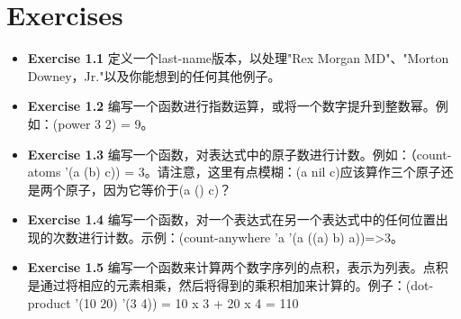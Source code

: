 \section{Exercises}
\begin{itemize}
	\item \textbf{Exercise 1.1 } 定义一个last-name版本，以处理"Rex Morgan MD"、"Morton Downey，Jr."以及你能想到的任何其他例子。
	\item \textbf{Exercise 1.2 } 编写一个函数进行指数运算，或将一个数字提升到整数幂。例如：(power 3 2) = 9。
	\item \textbf{Exercise 1.3 } 编写一个函数，对表达式中的原子数进行计数。例如：（count-atoms '(a (b) c)) = 3。请注意，这里有点模糊：(a nil c)应该算作三个原子还是两个原子，因为它等价于(a () c)？
	\item \textbf{Exercise 1.4 } 编写一个函数，对一个表达式在另一个表达式中的任何位置出现的次数进行计数。示例：(count-anywhere  'a '(a ((a) b) a))=>3。
	\item \textbf{Exercise 1.5 } 编写一个函数来计算两个数字序列的点积，表示为列表。点积是通过将相应的元素相乘，然后将得到的乘积相加来计算的。例子：(dot-product '(10 20) '(3 4)) = 10 x 3 + 20 x 4 = 110
\end{itemize}